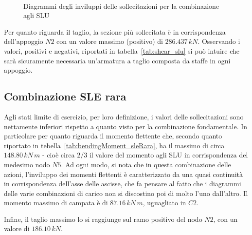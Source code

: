 \begin{figure}
 \centering
 \\
    
 \caption{Diagrammi degli inviluppi delle sollecitazioni per la combinazione agli SLU}
 \label{fig:envelope_slu}
\end{figure}

Per quanto riguarda il taglio, la sezione più sollecitata è in corrispondenza dell'appoggio $N2$ con un valore massimo (positivo) di $286.437\,kN$. Osservando i valori, positivi e negativi, riportati in tabella~\ref{tab:shear_slu} si può intuire che sarà sicuramente necessaria un'armatura a taglio composta da staffe in ogni appoggio.


\subsection{Combinazione SLE rara}

Agli stati limite di esercizio, per loro definizione, i valori delle sollecitazioni sono nettamente inferiori rispetto a quanto visto per la combinazione fondamentale. In particolare per quanto riguarda il momento flettente che, secondo quanto riportato in tebella~\ref{tab:bendingMoment_sleRara}, ha il massimo di circa $148.80\,kN\,m$ - cioè circa $2/3$ il valore del momento agli SLU in corrispondenza del medesimo nodo $N5$. Ad ogni modo, si nota che in questa combinazione delle azioni, l'inviluppo dei momenti flettenti è caratterizzato da una quasi continuità in corrispondenza dell'asse delle ascisse, che fa pensare al fatto che i diagrammi delle varie combinazioni di carico non si discostino poi di molto l'uno dall'altro. Il momento massimo di campata è di $87.16\,kN\,m$, uguagliato in $C2$.

Infine, il taglio massimo lo si raggiunge sul ramo positivo del nodo $N2$, con un valore di $186.10\,kN$.

